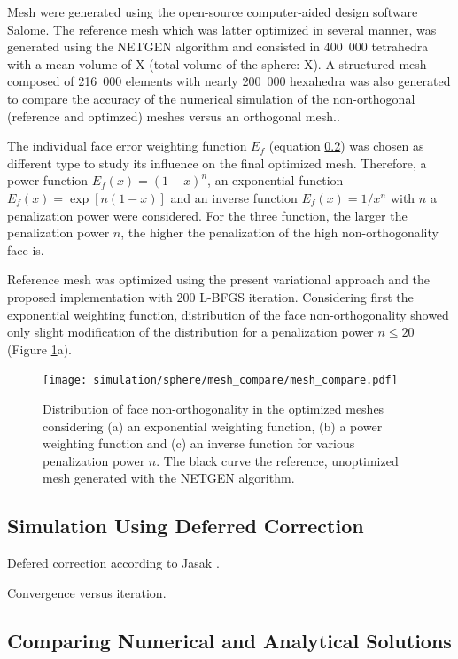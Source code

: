 \documentclass[11pt]{article}
\begin{document}
Mesh were generated using the open-source computer-aided design software Salome.
The reference mesh which was latter optimized in several manner, was generated using the NETGEN algorithm \cite{schrobert_netgen} and consisted in 400~000 tetrahedra with a mean volume of X (total volume of the sphere: X).
A structured mesh composed of 216~000 elements with nearly 200~000 hexahedra was also generated to compare the accuracy of the numerical simulation of the non-orthogonal (reference and optimzed) meshes versus an orthogonal mesh..

The individual face error weighting function $E_f$ (equation \ref{}) was chosen as different type to study its influence on the final optimized mesh.
Therefore, a power function $E_f(x) = (1-x)^n$, an exponential function $E_f(x) = \exp \left[n(1-x) \right]$ and an inverse function $E_f(x) = 1/x^n$ with $n$ a penalization power were considered.
For the three function, the larger the penalization power $n$, the higher the penalization of the high non-orthogonality face is.

Reference mesh was optimized using the present variational approach and the proposed implementation with 200 L-BFGS iteration. 
Considering first the exponential weighting function, distribution of the face non-orthogonality showed only slight modification of the distribution for a penalization power $n \leq 20$ (Figure \ref{orthogonality_distribution}a).

\begin{figure}[h!]
  \centering
  \texttt{[image: simulation/sphere/mesh\_compare/mesh\_compare.pdf]}
  \label{orthogonality_distribution}
  \caption{Distribution of face non-orthogonality in the optimized meshes considering (a) an exponential weighting function, (b) a power weighting function and (c) an inverse function for various penalization power $n$. The black curve the reference, unoptimized mesh generated with the NETGEN algorithm.}
\end{figure}



\subsection{Simulation Using Deferred Correction}

Defered correction according to Jasak \cite{}.

Convergence versus iteration.


\subsection{Comparing Numerical and Analytical Solutions}
\end{document}
